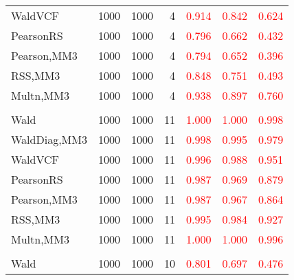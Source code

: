 \documentclass[
]{article}
\begin{document}
\begin{table}[H]
{\begin{tabular}[t]{lrrrrrr}
\hspace{1em}WaldVCF & 1000 & 1000 & 4 & \textcolor{red}{0.914} & \textcolor{red}{0.842} & \textcolor{red}{0.624}\\
\hspace{1em}PearsonRS & 1000 & 1000 & 4 & \textcolor{red}{0.796} & \textcolor{red}{0.662} & \textcolor{red}{0.432}\\
\hspace{1em}Pearson,MM3 & 1000 & 1000 & 4 & \textcolor{red}{0.794} & \textcolor{red}{0.652} & \textcolor{red}{0.396}\\
\hspace{1em}RSS,MM3 & 1000 & 1000 & 4 & \textcolor{red}{0.848} & \textcolor{red}{0.751} & \textcolor{red}{0.493}\\
\hspace{1em}Multn,MM3 & 1000 & 1000 & 4 & \textcolor{red}{0.938} & \textcolor{red}{0.897} & \textcolor{red}{0.760}\\
\addlinespace[0.3em]
\multicolumn{7}{l}{\textbf{1F 15V}}\\
\hspace{1em}Wald & 1000 & 1000 & 11 & \textcolor{red}{1.000} & \textcolor{red}{1.000} & \textcolor{red}{0.998}\\
\hspace{1em}WaldDiag,MM3 & 1000 & 1000 & 11 & \textcolor{red}{0.998} & \textcolor{red}{0.995} & \textcolor{red}{0.979}\\
\hspace{1em}WaldVCF & 1000 & 1000 & 11 & \textcolor{red}{0.996} & \textcolor{red}{0.988} & \textcolor{red}{0.951}\\
\hspace{1em}PearsonRS & 1000 & 1000 & 11 & \textcolor{red}{0.987} & \textcolor{red}{0.969} & \textcolor{red}{0.879}\\
\hspace{1em}Pearson,MM3 & 1000 & 1000 & 11 & \textcolor{red}{0.987} & \textcolor{red}{0.967} & \textcolor{red}{0.864}\\
\hspace{1em}RSS,MM3 & 1000 & 1000 & 11 & \textcolor{red}{0.995} & \textcolor{red}{0.984} & \textcolor{red}{0.927}\\
\hspace{1em}Multn,MM3 & 1000 & 1000 & 11 & \textcolor{red}{1.000} & \textcolor{red}{1.000} & \textcolor{red}{0.996}\\
\addlinespace[0.3em]
\multicolumn{7}{l}{\textbf{2F 10V}}\\
\hspace{1em}Wald & 1000 & 1000 & 10 & \textcolor{red}{0.801} & \textcolor{red}{0.697} & \textcolor{red}{0.476}\\

\end{tabular}}
\end{table}
\end{document}
